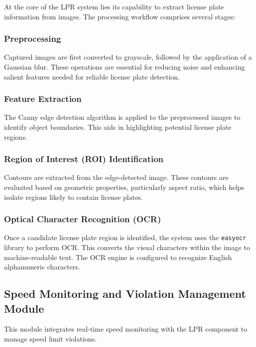 At the core of the LPR system lies its capability to extract license plate information from images. The processing workflow comprises several stages:

\subsubsection{Preprocessing}

Captured images are first converted to grayscale, followed by the application of a Gaussian blur. These operations are essential for reducing noise and enhancing salient features needed for reliable license plate detection.

\subsubsection{Feature Extraction}

The Canny edge detection algorithm is applied to the preprocessed images to identify object boundaries. This aids in highlighting potential license plate regions.

\subsubsection{Region of Interest (ROI) Identification}

Contours are extracted from the edge-detected image. These contours are evaluated based on geometric properties, particularly aspect ratio, which helps isolate regions likely to contain license plates.

\subsubsection{Optical Character Recognition (OCR)}

Once a candidate license plate region is identified, the system uses the \texttt{easyocr} library to perform OCR. This converts the visual characters within the image to machine-readable text. The OCR engine is configured to recognize English alphanumeric characters.

\subsection{Speed Monitoring and Violation Management Module}

This module integrates real-time speed monitoring with the LPR component to manage speed limit violations.

